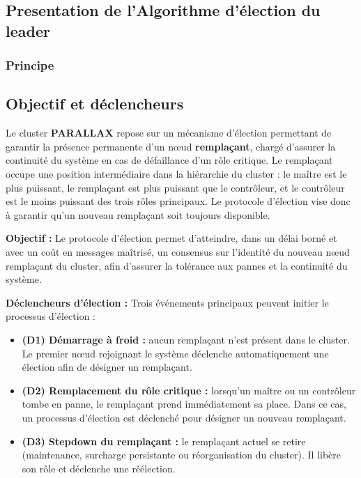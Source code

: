 \documentclass[12pt,a4paper]{report}
\theoremstyle{definition}
\begin{document}
\subsection{Presentation de l'Algorithme d'élection du leader}

\subsubsection{Principe}

\subsection{Objectif et déclencheurs}

Le cluster \textbf{PARALLAX} repose sur un mécanisme d’élection permettant de garantir la présence permanente d’un nœud \textbf{remplaçant}, chargé d’assurer la continuité du système en cas de défaillance d’un rôle critique. Le remplaçant occupe une position intermédiaire dans la hiérarchie du cluster : le maître est le plus puissant, le remplaçant est plus puissant que le contrôleur, et le contrôleur est le moins puissant des trois rôles principaux. Le protocole d’élection vise donc à garantir qu’un nouveau remplaçant soit toujours disponible.

\textbf{Objectif :}  
Le protocole d’élection permet d’atteindre, dans un délai borné et avec un coût en messages maîtrisé, un consensus sur l’identité du nouveau nœud remplaçant du cluster, afin d’assurer la tolérance aux pannes et la continuité du système.

\textbf{Déclencheurs d’élection :}
Trois événements principaux peuvent initier le processus d’élection :

\begin{itemize}
    \item[$\bullet$] \textbf{(D1) Démarrage à froid :} aucun remplaçant n’est présent dans le cluster. Le premier nœud rejoignant le système déclenche automatiquement une élection afin de désigner un remplaçant.

    \item [$\bullet$]\textbf{(D2) Remplacement du rôle critique :} lorsqu’un maître ou un contrôleur tombe en panne, le remplaçant prend immédiatement sa place. Dans ce cas, un processus d’élection est déclenché pour désigner un nouveau remplaçant.

    \item [$\bullet$]\textbf{(D3) Stepdown du remplaçant :} le remplaçant actuel se retire (maintenance, surcharge persistante ou réorganisation du cluster). Il libère son rôle et déclenche une réélection.
\end{itemize}
\end{document}
